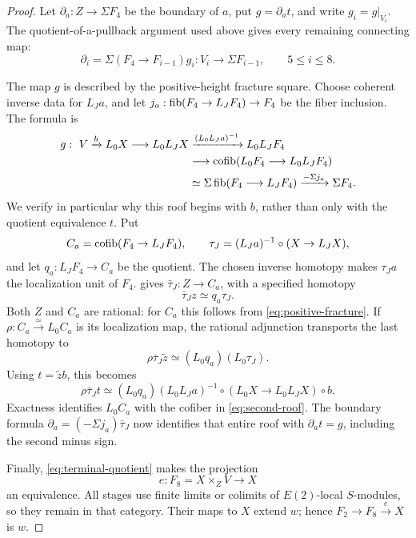 \begin{proof}
Let \(\partial_a:Z\to\Sigma F_4\) be the boundary of \(a\),
put \(g=\partial_at\), and write \(g_i=g|_{V_i}\).
The quotient-of-a-pullback argument used above gives every remaining
connecting map:
\begin{equation}\label{eq:last-boundaries}
 \partial_i=\Sigma(F_4\to F_{i-1})g_i:
 V_i\longrightarrow\Sigma F_{i-1},\qquad 5\leq i\leq8.
\end{equation}

The map \(g\) is described by the positive-height fracture square.
Choose coherent inverse data for \(L_Ja\), and let
\(j_a:\operatorname{fib}(F_4\to L_JF_4)\to F_4\) be the fiber inclusion.
The formula is
\begin{equation}\label{eq:second-roof}
\begin{aligned}[b]
 g:\ V\xrightarrow bL_0X\longrightarrow L_0L_JX
 &\xrightarrow{(L_0L_Ja)^{-1}}L_0L_JF_4\\
 &\longrightarrow\operatorname{cofib}(L_0F_4\longrightarrow L_0L_JF_4)\\
 &\simeq\Sigma\operatorname{fib}(F_4\longrightarrow L_JF_4)
   \xrightarrow{-\Sigma j_a}\Sigma F_4.
\end{aligned}
\end{equation}
We verify in particular why this roof begins with \(b\), rather
than only with the quotient equivalence \(t\).
Put
\[
 C_a=\operatorname{cofib}(F_4\to L_JF_4),\qquad
 \tau_J=(L_Ja)^{-1}\circ(X\to L_JX),
\]
and let \(q_a:L_JF_4\to C_a\) be the quotient.  The chosen inverse
homotopy makes \(\tau_Ja\) the localization unit of \(F_4\).
 gives \(\bar\tau_J:Z\to C_a\), with a
specified homotopy
\[
 \bar\tau_Jz\simeq q_a\tau_J.
\]
Both \(Z\) and \(C_a\) are rational: for \(C_a\) this follows
from \eqref{eq:positive-fracture}.  If
\(\rho:C_a\xrightarrow{\simeq}L_0C_a\) is its localization map,
the rational adjunction transports the last homotopy to
\[
 \rho\bar\tau_J\widetilde z\simeq (L_0q_a)(L_0\tau_J).
\]
Using \(t=\widetilde z b\), this becomes
\[
 \rho\bar\tau_Jt\simeq
 (L_0q_a)(L_0L_Ja)^{-1}\circ
 (L_0X\to L_0L_JX)\circ b.
\]
Exactness identifies \(L_0C_a\) with the cofiber in
\eqref{eq:second-roof}.  The boundary formula
\(\partial_a=(-\Sigma j_a)\bar\tau_J\) now identifies that
entire roof with \(\partial_at=g\), including the second minus sign.

Finally, \eqref{eq:terminal-quotient} makes the projection
\[
 e:F_8=X\times_ZV\longrightarrow X
\]
an equivalence.  All stages use finite limits or colimits of
\(E(2)\)-local \(S\)-modules, so they remain in that category.
Their maps to \(X\) extend \(w\); hence
\(F_2\to F_8\xrightarrow eX\) is \(w\).
\end{proof}

